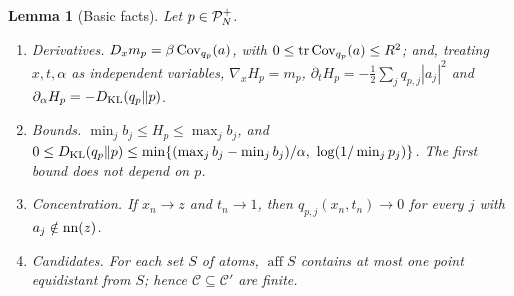 \documentclass{article} %
\theoremstyle{plain}
\newtheorem{lemma}[theorem]{Lemma}
\theoremstyle{definition}
\theoremstyle{remark}
\begin{document}
\begin{lemma}[Basic facts]
\label{lem:basic}
Let $p\in\mathcal{P}_N^{+}$.
\begin{enumerate}[label=(\alph*),leftmargin=2em]
\item \emph{Derivatives.} $D_xm_p=\beta\operatorname{Cov}_{q_p}(a)$, with $0\le\operatorname{tr}\operatorname{Cov}_{q_p}(a)\le R^2$; and,
  treating $x,t,\alpha$ as independent variables, $\nabla_xH_p=m_p$,
  $\partial_tH_p=-\tfrac12\sum_jq_{p,j}|a_j|^2$ and $\partial_\alpha H_p=-D_{\rm KL}(q_p\Vert p)$.
\item \emph{Bounds.} $\min_jb_j\le H_p\le\max_jb_j$, and
  $0\le D_{\rm KL}(q_p\Vert p)\le\min\{(\max_jb_j-\min_jb_j)/\alpha,\ \log(1/\min_jp_j)\}$.
  The first bound does not depend on $p$.
\item \emph{Concentration.} If $x_n\to z$ and $t_n\to1$, then $q_{p,j}(x_n,t_n)\to0$ for every
  $j$ with $a_j\notin\operatorname{nn}(z)$.
\item \emph{Candidates.} For each set $S$ of atoms, $\operatorname{aff}S$ contains at most one
  point equidistant from $S$; hence $\mathcal C\subseteq\mathcal C'$ are finite.
\end{enumerate}
\end{lemma}
\end{document}
